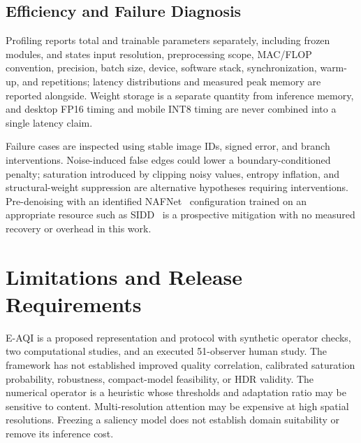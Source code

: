 \documentclass[5p,times,twocolumn]{elsarticle}
\begin{document}
\subsection{Efficiency and Failure Diagnosis}
\label{sec:efficiency}

Profiling reports total and trainable parameters separately, including frozen
modules, and states input resolution, preprocessing scope, MAC/FLOP
convention, precision, batch size, device, software stack, synchronization,
warm-up, and repetitions; latency distributions and measured peak memory are
reported alongside. Weight storage is a separate quantity from inference
memory, and desktop FP16 timing and mobile INT8 timing are never combined
into a single latency claim.

Failure cases are inspected using stable image IDs, signed error, and branch
interventions. Noise-induced false edges could lower a boundary-conditioned
penalty; saturation introduced by clipping noisy values, entropy inflation,
and structural-weight suppression are alternative hypotheses requiring
interventions. Pre-denoising with an identified
NAFNet~\cite{chen2022nafnet} configuration trained on an appropriate resource
such as SIDD~\cite{abdelhamed2018sidd} is a prospective mitigation with no
measured recovery or overhead in this work.

\section{Limitations and Release Requirements}
\label{sec:limitations}

E-AQI is a proposed representation and protocol with synthetic operator
checks, two computational studies, and an executed 51-observer human study.
The framework has not established improved quality correlation, calibrated
saturation probability, robustness, compact-model feasibility, or HDR
validity. The numerical operator is a heuristic whose thresholds and
adaptation ratio may be sensitive to content. Multi-resolution attention may
be expensive at high spatial resolutions. Freezing a saliency model does not
establish domain suitability or remove its inference cost.
\end{document}

